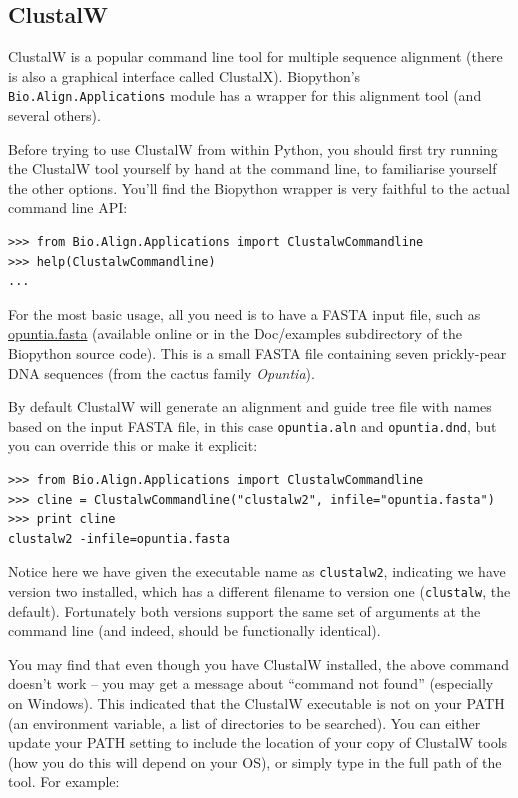\documentclass{report}
\begin{document}
\subsection{ClustalW}
\label{sec:align_clustal}
ClustalW is a popular command line tool for multiple sequence alignment
(there is also a graphical interface called ClustalX). Biopython's
\verb|Bio.Align.Applications| module has a wrapper for this alignment tool
(and several others).

Before trying to use ClustalW from within Python, you should first try running
the ClustalW tool yourself by hand at the command line, to familiarise
yourself the other options. You'll find the Biopython wrapper is very
faithful to the actual command line API:

\begin{verbatim}
>>> from Bio.Align.Applications import ClustalwCommandline
>>> help(ClustalwCommandline)
...
\end{verbatim}

For the most basic usage, all you need is to have a FASTA input file, such as
\href{http://biopython.org/DIST/docs/tutorial/examples/opuntia.fasta}{opuntia.fasta}
(available online or in the Doc/examples subdirectory of the Biopython source
code). This is a small FASTA file containing seven prickly-pear DNA sequences
(from the cactus family \textit{Opuntia}).

By default ClustalW will generate an alignment and guide tree file with names
based on the input FASTA file, in this case \texttt{opuntia.aln} and
\texttt{opuntia.dnd}, but you can override this or make it explicit:

\begin{verbatim}
>>> from Bio.Align.Applications import ClustalwCommandline
>>> cline = ClustalwCommandline("clustalw2", infile="opuntia.fasta")
>>> print cline
clustalw2 -infile=opuntia.fasta
\end{verbatim}

Notice here we have given the executable name as \texttt{clustalw2},
indicating we have version two installed, which has a different filename to
version one (\texttt{clustalw}, the default). Fortunately both versions
support the same set of arguments at the command line (and indeed, should be
functionally identical).

You may find that even though you have ClustalW installed, the above command
doesn't work -- you may get a message about ``command not found'' (especially
on Windows). This indicated that the ClustalW executable is not on your PATH
(an environment variable, a list of directories to be searched). You can
either update your PATH setting to include the location of your copy of
ClustalW tools (how you do this will depend on your OS), or simply type in
the full path of the tool. For example:
\end{document}
